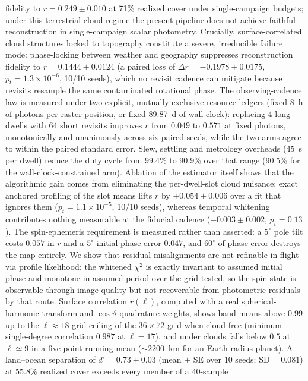 \documentclass[twocolumn,10pt]{article}
\begin{document}
{\begin{center}
\begin{minipage}{0.86\textwidth}
fidelity to $r=0.249\pm0.010$ at 71\% realized cover under single-campaign
budgets; under this terrestrial cloud regime the present pipeline does not achieve faithful reconstruction in single-campaign scalar photometry.
Crucially, surface-correlated cloud structures locked to topography constitute a severe, irreducible failure mode: phase-locking between weather and geography suppresses reconstruction fidelity to $r = 0.1444 \pm 0.0124$ (a paired loss of $\Delta r = -0.1978 \pm 0.0175$, $p_t = 1.3 \times 10^{-6}$, 10/10 seeds), which no revisit cadence can mitigate because revisits resample the same contaminated rotational phase. The observing-cadence law is measured under two explicit,
mutually exclusive resource ledgers (fixed 8~h of photons per raster position,
or fixed 89.87~d of wall clock): replacing 4 long dwells with 64 short revisits
improves $r$ from $0.049$ to $0.571$ at fixed photons, monotonically and
unanimously across six paired seeds, while the two arms agree to within the
paired standard error. Slew, settling and metrology overheads (45~s per dwell)
reduce the duty cycle from 99.4\% to 90.9\% over that range (90.5\% for the
wall-clock-constrained arm). Ablation of
the estimator itself shows that the algorithmic gain comes from eliminating the
per-dwell-slot cloud nuisance: exact anchored profiling of the slot means lifts
$r$ by $+0.054\pm0.006$ over a fit that ignores them ($p_t=1.1\times10^{-5}$,
10/10 seeds), whereas temporal whitening contributes nothing measurable at the
fiducial cadence ($-0.003\pm0.002$, $p_t=0.13$). The spin-ephemeris
requirement is measured rather than asserted: a $5^\circ$ pole tilt costs
$0.057$ in $r$ and a $5^\circ$ initial-phase error $0.047$, and $60^\circ$ of
phase error destroys the map entirely. We show that residual
misalignments are not refinable in flight via profile likelihood: the whitened
$\chi^2$ is exactly invariant to assumed initial phase and monotone in assumed
period over the grid tested, so the spin state is observable through image
quality but not recoverable from photometric residuals by that route.
Surface correlation $r(\ell)$, computed with a real spherical-harmonic
transform and $\cos\vartheta$ quadrature weights, shows band means above $0.99$ up to
the $\ell\approx18$ grid ceiling of the $36\times72$ grid when cloud-free (minimum single-degree correlation $0.987$ at $\ell=17$),
and under clouds falls below $0.5$ at $\ell\simeq9$ in a five-point running mean
($\sim2200$~km for an Earth-radius planet). A land--ocean separation of
$d'=0.73\pm0.03$ (mean $\pm$ SE over 10 seeds; $\mathrm{SD}=0.081$) at $55.8\%$ realized cover exceeds every member of a 40-sample

\end{minipage}
\end{center}}
\end{document}
